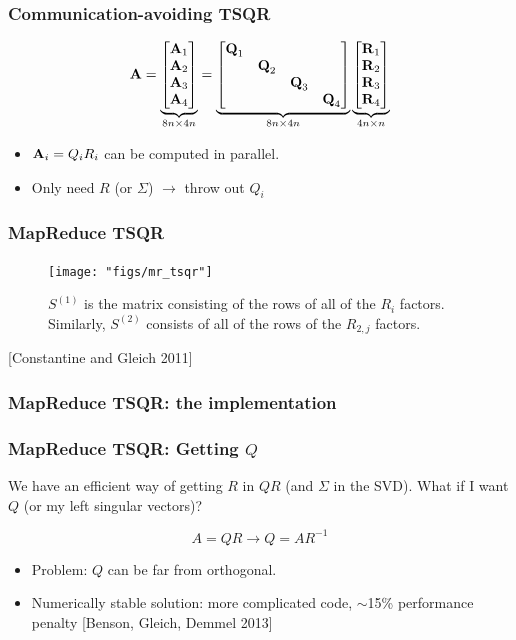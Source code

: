 \documentclass{beamer}
\begin{document}
\begin{frame}
\frametitle{Communication-avoiding TSQR}
\[
\boldsymbol{\mathrm{A}} = \underbrace{\begin{bmatrix} \boldsymbol{\mathrm{A}}_1 \\ \boldsymbol{\mathrm{A}}_2 \\ \boldsymbol{\mathrm{A}}_3 \\ \boldsymbol{\mathrm{A}}_4 \end{bmatrix} }_{8n \times 4n}
= \underbrace{\begin{bmatrix}  \boldsymbol{\mathrm{Q}}_1 \\ & \boldsymbol{\mathrm{Q}}_2 \\ & & \boldsymbol{\mathrm{Q}}_3 \\ & & & \boldsymbol{\mathrm{Q}}_4  \end{bmatrix}}_{8n \times 4n}
      \underbrace{\begin{bmatrix}  \boldsymbol{\mathrm{R}}_1 \\ \boldsymbol{\mathrm{R}}_2 \\ \boldsymbol{\mathrm{R}}_3 \\ \boldsymbol{\mathrm{R}}_4 \end{bmatrix}}_{4n \times n}
\]

\vspace{0.4in}

\begin{itemize}
\item $\boldsymbol{\mathrm{A}}_i = Q_iR_i$ can be computed in parallel.
\item Only need $R$ (or $\Sigma$) $\to$ throw out $Q_i$
\end{itemize}
\end{frame}

\begin{frame}
\frametitle{MapReduce TSQR}

\begin{figure}[h!]
\centering
\texttt{[image: "figs/mr\_tsqr"]}
\caption{$S^{(1)}$ is the matrix consisting of the rows of all of the $R_i$ factors.  Similarly, $S^{(2)}$ consists of all of the rows of the $R_{2, j}$ factors.}
\end{figure}

[Constantine and Gleich 2011]

\end{frame}


\begin{frame}
\frametitle{MapReduce TSQR: the implementation}
\lstset{basicstyle=\tiny}
\lstset{numbers=left}

\end{frame}


\begin{frame}
\frametitle{MapReduce TSQR: Getting $Q$}
We have an efficient way of getting $R$ in $QR$ (and $\Sigma$ in the SVD).  What if I want $Q$ (or my left singular vectors)?

\vspace{0.2in}

\[
A = QR \rightarrow Q = AR^{-1}
\]

\vspace{0.2in}

\begin{itemize}
\item \textcolor{problem}{Problem}:  $Q$ can be far from orthogonal.
\item \textcolor{theblue}{Numerically stable solution}: more complicated code, $\sim$15\% performance penalty
[Benson, Gleich, Demmel 2013]
\end{itemize}

\end{frame}
\end{document}

